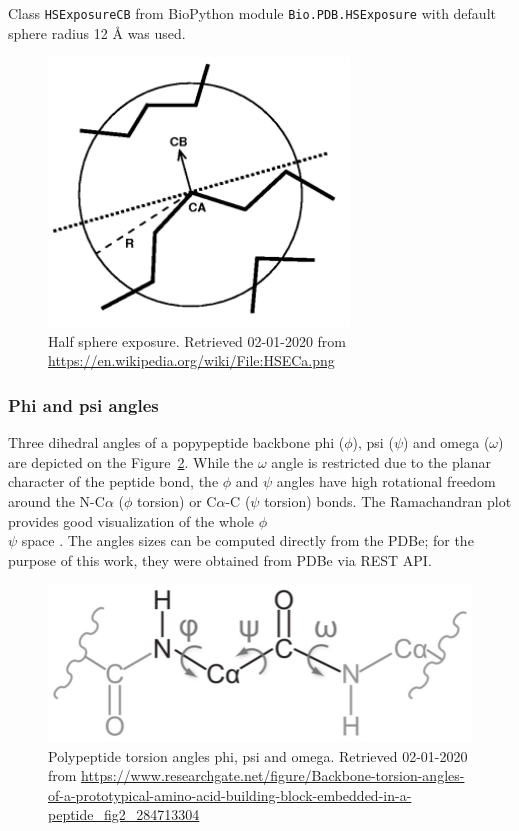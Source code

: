 Class \texttt{HSExposureCB} from BioPython module \texttt{Bio.PDB.HSExposure} with default sphere radius 12 {\AA} was used. 

\begin{figure}[!h]\centering
\includegraphics[width=80mm]{../img/hse.png}
\caption{Half sphere exposure. Retrieved 02-01-2020 from \url{https://en.wikipedia.org/wiki/File:HSECa.png}}
\label{fig:hse}
\end{figure}


\subsubsection{Phi and psi angles}

Three dihedral angles of a popypeptide backbone phi ($\phi$), psi ($\psi$) and omega ($\omega$) are depicted on the Figure~\ref{fig:torsion}. While the $\omega$ angle is restricted due to the planar character of the peptide bond, the $\phi$ and $\psi$ angles have high rotational freedom around the N-C$\alpha$ ($\phi$ torsion) or C$\alpha$-C ($\psi$ torsion) bonds. The Ramachandran plot provides good visualization of the whole $\phi$\\$\psi$ space \cite{ramachandran}.
The angles sizes can be computed directly from the PDBe; for the purpose of this work, they were obtained from PDBe via REST API.

\begin{figure}[!h]\centering
\includegraphics[width=120mm]{../img/torsion.png}
\caption{Polypeptide torsion angles phi, psi and omega. Retrieved 02-01-2020 from \url{https://www.researchgate.net/figure/Backbone-torsion-angles-of-a-prototypical-amino-acid-building-block-embedded-in-a-peptide_fig2_284713304}}
\label{fig:torsion}
\end{figure}

